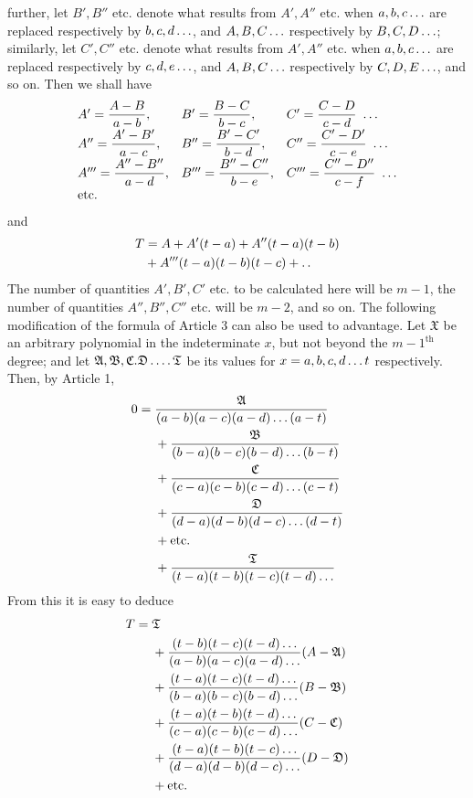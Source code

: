 further, let $B',B''$ etc. denote what results from $A',A''$ etc. when $a,b,c\mathinner{.\,.\,.}$
are replaced respectively by $b,c,d\mathinner{.\,.\,.}$, and $A,B,C\mathinner{.\,.\,.}$ respectively by $B,C,D\mathinner{.\,.\,.}$; similarly, let $C',C''$ etc. denote what results from $A',A''$ etc. when $a,b,c\mathinner{.\,.\,.}$ are replaced respectively by $c,d,e\mathinner{.\,.\,.}$, and $A,B,C\mathinner{.\,.\,.}$ respectively by $C,D,E\mathinner{.\,.\,.}$, and so on. Then we shall have
\[
\begin{array}{lll}
A'=\dfrac{A-B}{a-b},&B'=\dfrac{B-C}{b-c},&C'=\dfrac{C-D}{c-d}\ \mathinner{.\,.\,.}\\[5pt]
A''=\dfrac{A'-B'}{a-c},&B''=\dfrac{B'-C'}{b-d},&C''=\dfrac{C'-D'}{c-e}\ \mathinner{.\,.\,.}\\[5pt]
A'''=\dfrac{A''-B''}{a-d},&B'''=\dfrac{B''-C''}{b-e},&C'''=\dfrac{C''-D''}{c-f}\ \mathinner{.\,.\,.}\\
\text{etc.}&&
\end{array}
\]
and
\[\begin{aligned}
T&=A+A'(t-a)+A''(t-a)(t-b)\\&+A'''(t-a)(t-b)(t-c)+\mathinner{.\,.}
\end{aligned}\]
The number of quantities $A',B',C'$ etc. to be calculated here will be $m-1$, the number of
quantities $A'',B'',C''$ etc. will be $m-2$, and so on.
The following modification of the formula of Article 3 can also be used
to advantage. Let $\mathfrak{X}$ be an arbitrary polynomial in the indeterminate $x$, but not beyond the
$m-1^{\mathrm{th}}$ degree; and let $\mathfrak{A},\mathfrak{B},\mathfrak{C}.\mathfrak{D}\mathinner{.\,.\,.\,.}\mathfrak{T}$ be its values for $x=a,b,c,d\mathinner{.\,.\,.}t$
respectively. Then, by Article 1,
\[
\begin{aligned}
0={}&\frac{\mathfrak{A}}{(a-b)(a-c)(a-d)\mathinner{.\,.\,.}(a-t)}\\
&{}+\frac{\mathfrak{B}}{(b-a)(b-c)(b-d)\mathinner{.\,.\,.}(b-t)}\\
&{}+\frac{\mathfrak{C}}{(c-a)(c-b)(c-d)\mathinner{.\,.\,.}(c-t)}\\
&{}+\frac{\mathfrak{D}}{(d-a)(d-b)(d-c)\mathinner{.\,.\,.}(d-t)}\\
&{}+\text{etc.}\\
&{}+\frac{\mathfrak{T}}{(t-a)(t-b)(t-c)(t-d)\mathinner{.\,.\,.}}
\end{aligned}
\]
From this it is easy to deduce
\[
\begin{aligned}
T={}&\mathfrak{T}\\
&{}+\frac{(t-b)(t-c)(t-d)\mathinner{.\,.\,.}}{(a-b)(a-c)(a-d)\mathinner{.\,.\,.}}(A-\mathfrak{A})\\
&{}+\frac{(t-a)(t-c)(t-d)\mathinner{.\,.\,.}}{(b-a)(b-c)(b-d)\mathinner{.\,.\,.}}(B-\mathfrak{B})\\
&{}+\frac{(t-a)(t-b)(t-d)\mathinner{.\,.\,.}}{(c-a)(c-b)(c-d)\mathinner{.\,.\,.}}(C-\mathfrak{C})\\
&{}+\frac{(t-a)(t-b)(t-c)\mathinner{.\,.\,.}}{(d-a)(d-b)(d-c)\mathinner{.\,.\,.}}(D-\mathfrak{D})\\
&{}+\text{etc.}
\end{aligned}
\]
